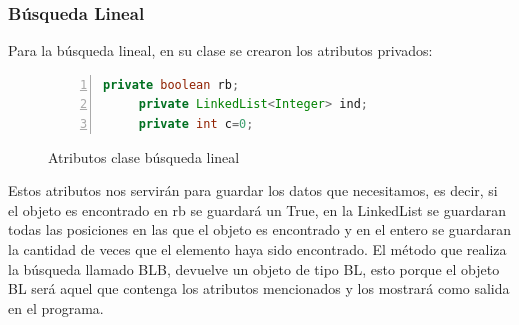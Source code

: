 \documentclass{report}
\begin{document}
\subsubsection{Búsqueda Lineal}
Para la búsqueda lineal, en su clase se crearon los atributos privados:\\
\begin{figure}[htbp]
\centering
\begin{lstlisting}[language=Java, frame=lines, framesep=2mm, basicstyle=\footnotesize\ttfamily, numbers=left]
     private boolean rb;
     private LinkedList<Integer> ind;
     private int c=0;
\end{lstlisting}
\caption{Atributos clase búsqueda lineal}
\end{figure}

Estos atributos nos servirán para guardar los datos que necesitamos, es decir, si el objeto es encontrado en rb se guardará un True, en la LinkedList se guardaran todas las posiciones en las que el objeto es encontrado y en el entero se guardaran la cantidad de veces que el elemento haya sido encontrado.
\newpage
El método que realiza la búsqueda llamado BLB, devuelve un objeto de tipo BL, esto porque el objeto BL será aquel que contenga los atributos mencionados y los mostrará como salida en el programa.
\end{document}
